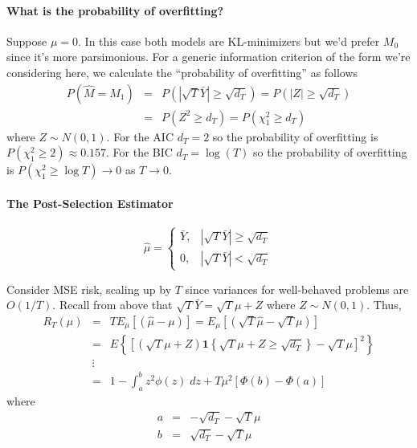 \documentclass[12pt]{article}
\theoremstyle{definition}
\begin{document}
\paragraph{What is the probability of overfitting?} Suppose $\mu = 0$. In this case both models are KL-minimizers but we'd prefer $M_0$ since it's more parsimonious. For a generic information criterion of the form we're considering here, we calculate the ``probability of overfitting'' as follows
\begin{eqnarray*}
	P\left(\widehat{M} = M_1\right) &=& P\left(|\sqrt{T}\bar{Y}|\geq \sqrt{d_T}\right) = P(|Z|\geq \sqrt{d_T})\\
	 &=& P(Z^2 \geq d_T) = P(\chi^2_1 \geq d_T)
\end{eqnarray*}
where $Z \sim N(0,1)$. For the AIC $d_T = 2$ so the probability of overfitting is $P(\chi^2_1 \geq 2)\approx 0.157$. For the BIC $d_T = \log(T)$ so the probability of overfitting is $P(\chi^2_1 \geq \log T) \rightarrow 0$ as $T\rightarrow 0$.

\paragraph{The Post-Selection Estimator}

	$$\widehat{\mu}=\left\{\begin{array}
		{cc} \bar{Y}, & |\sqrt{T}\bar{Y} | \geq \sqrt{d_T} \\
		0, & |\sqrt{T}\bar{Y} | < \sqrt{d_T}
		\end{array}\right.$$

Consider MSE risk, scaling up by $T$ since variances for well-behaved problems are $O(1/T)$. Recall from above that $\sqrt{T} \bar{Y} = \sqrt{T}\mu +Z$ where $Z\sim N(0,1)$. Thus,
\begin{eqnarray*}
	R_T(\mu) &=& T E_\mu\left[\left( \widehat{\mu} - \mu\right)\right] = E_\mu\left[\left(\sqrt{T} \widehat{\mu} - \sqrt{T} \mu\right)\right]\\
		&=& E\left\{\left[ \left(\sqrt{T}\mu + Z \right)\mathbf{1}\left\{\sqrt{T}\mu + Z \geq \sqrt{d_T}\right\}- \sqrt{T}\mu \right]^2 \right\}\\
		&\vdots& \\
		&=& 1 - \int_{a}^{b} z^2 \phi(z)\; dz + T\mu^2 \left[\Phi(b) - \Phi(a) \right]
\end{eqnarray*}
where
	\begin{eqnarray*}
		a &=& -\sqrt{d_T} - \sqrt{T}\mu\\
		b &=& \sqrt{d_T} - \sqrt{T}\mu
	\end{eqnarray*}
\end{document}
